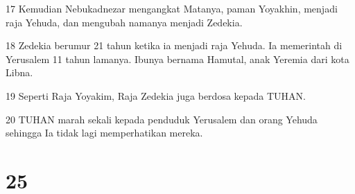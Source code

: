\par 17 Kemudian Nebukadnezar mengangkat Matanya, paman Yoyakhin, menjadi raja Yehuda, dan mengubah namanya menjadi Zedekia.
\par 18 Zedekia berumur 21 tahun ketika ia menjadi raja Yehuda. Ia memerintah di Yerusalem 11 tahun lamanya. Ibunya bernama Hamutal, anak Yeremia dari kota Libna.
\par 19 Seperti Raja Yoyakim, Raja Zedekia juga berdosa kepada TUHAN.
\par 20 TUHAN marah sekali kepada penduduk Yerusalem dan orang Yehuda sehingga Ia tidak lagi memperhatikan mereka.

\chapter{25}

